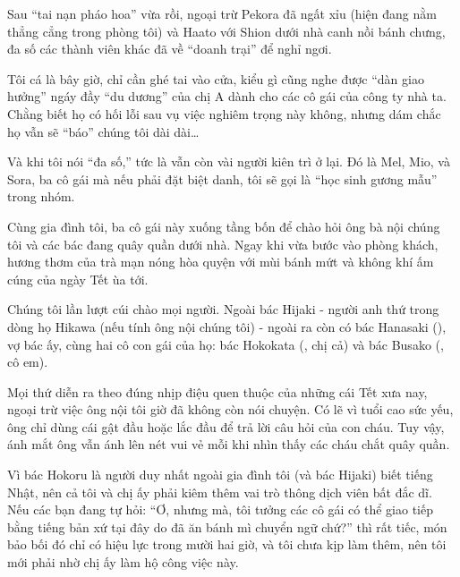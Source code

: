 \documentclass[../main.tex]{subfiles}
\begin{document}

Sau ``tai nạn pháo hoa'' vừa rồi, ngoại trừ Pekora đã ngất xỉu (hiện đang nằm thẳng cẳng trong phòng tôi) và Haato với Shion dưới nhà canh nồi bánh chưng, đa số các thành viên khác đã về ``doanh trại'' để nghỉ ngơi.

Tôi cá là bây giờ, chỉ cần ghé tai vào cửa, kiểu gì cũng nghe được ``dàn giao hưởng'' ngáy đầy ``du dương'' của chị A dành cho các cô gái của công ty nhà ta. Chằng biết họ có hối lỗi sau vụ việc nghiêm trọng này không, nhưng dám chắc họ vẫn sẽ ``báo'' chúng tôi dài dài\dots

Và khi tôi nói ``đa số,'' tức là vẫn còn vài người kiên trì ở lại. Đó là Mel, Mio, và Sora, ba cô gái mà nếu phải đặt biệt danh, tôi sẽ gọi là ``học sinh gương mẫu'' trong nhóm.

Cùng gia đình tôi, ba cô gái này xuống tầng bốn để chào hỏi ông bà nội chúng tôi và các bác đang quây quần dưới nhà. Ngay khi vừa bước vào phòng khách, hương thơm của trà mạn nóng hòa quyện với mùi bánh mứt và không khí ấm cúng của ngày Tết ùa tới.

Chúng tôi lần lượt cúi chào mọi người. Ngoài bác Hijaki - người anh thứ trong dòng họ Hikawa (nếu tính ông nội chúng tôi) - ngoài ra còn có bác Hanasaki (), vợ bác ấy, cùng hai cô con gái của họ: bác Hokokata (, chị cả) và bác Busako (, cô em).

Mọi thứ diễn ra theo đúng nhịp điệu quen thuộc của những cái Tết xưa nay, ngoại trừ việc ông nội tôi giờ đã không còn nói chuyện. Có lẽ vì tuổi cao sức yếu, ông chỉ dùng cái gật đầu hoặc lắc đầu để trả lời câu hỏi của con cháu. Tuy vậy, ánh mắt ông vẫn ánh lên nét vui vẻ mỗi khi nhìn thấy các cháu chắt quây quần.

Vì bác Hokoru là người duy nhất ngoài gia đình tôi (và bác Hijaki) biết tiếng Nhật, nên cả tôi và chị ấy phải kiêm thêm vai trò thông dịch viên bất đắc dĩ. Nếu các bạn đang tự hỏi: ``Ơ, nhưng mà, tôi tưởng các cô gái có thể giao tiếp bằng tiếng bản xứ tại đây do đã ăn bánh mì chuyển ngữ chứ?'' thì rất tiếc, món bảo bối đó chỉ có hiệu lực trong mười hai giờ, và tôi chưa kịp làm thêm, nên tôi mới phải nhờ chị ấy làm hộ công việc này.
\end{document}
